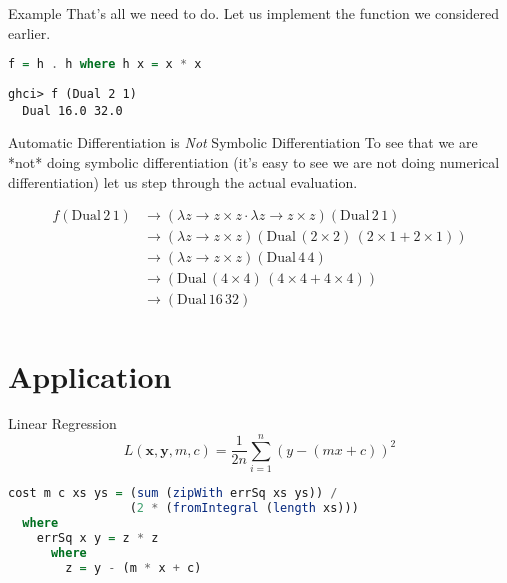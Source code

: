 \documentclass{beamer}
\begin{document}
\begin{frame}[fragile]{Example}
That's all we need to do. Let us implement the function we considered
earlier.

\begin{scriptsize}
\begin{lstlisting}[language=Haskell]
f = h . h where h x = x * x
\end{lstlisting}
\end{scriptsize}

\begin{scriptsize}
\begin{lstlisting}
ghci> f (Dual 2 1)
  Dual 16.0 32.0
\end{lstlisting}
\end{scriptsize}
\end{frame}

\begin{frame}[fragile]{Automatic Differentiation is {\em Not} Symbolic
    Differentiation}
To see that we are *not* doing symbolic differentiation (it's easy to
see we are not doing numerical differentiation) let us step
through the actual evaluation.

$$
\begin{aligned}
f (\mathrm{Dual}\,2\,1) &\longrightarrow (\lambda z \rightarrow z
\times z \cdot \lambda z \rightarrow z \times z) (\mathrm{Dual}\,2\,1) \\
&\longrightarrow (\lambda z \rightarrow z
\times z) (\mathrm{Dual}\,(2 \times 2)\,(2 \times 1 + 2 \times 1)) \\
&\longrightarrow  (\lambda z \rightarrow z
\times z) (\mathrm{Dual}\,4\,4)\\
&\longrightarrow (\mathrm{Dual}\,(4 \times 4)\,(4 \times 4 + 4 \times 4)) \\
&\longrightarrow (\mathrm{Dual}\,16\,32)\\
\end{aligned}
$$
\end{frame}

\section{Application}

\begin{frame}[fragile]{Linear Regression}
$$
L(\boldsymbol{x}, \boldsymbol{y}, m, c) = \frac{1}{2n}\sum_{i=1}^n (y - (mx + c))^2
$$
\begin{scriptsize}
\begin{lstlisting}[language=Haskell]
cost m c xs ys = (sum (zipWith errSq xs ys)) /
                 (2 * (fromIntegral (length xs)))
  where
    errSq x y = z * z
      where
        z = y - (m * x + c)
\end{lstlisting}
\end{scriptsize}
\end{frame}
\end{document}
